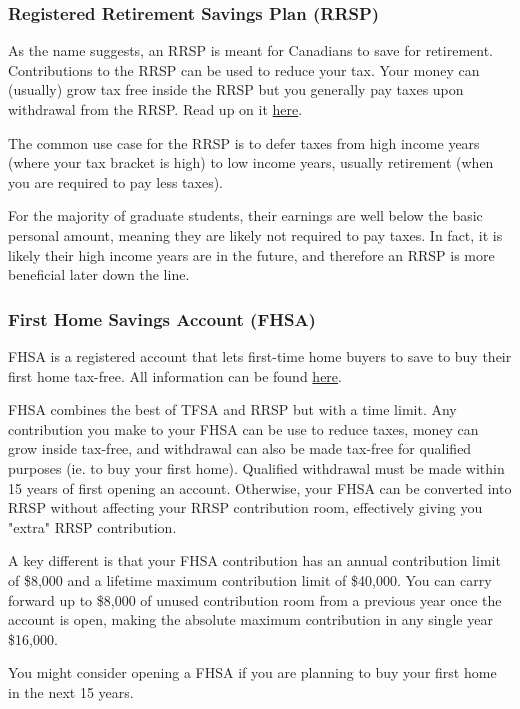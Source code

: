 \subsubsection{Registered Retirement Savings Plan (RRSP)} 
As the name suggests, an RRSP is meant for Canadians to save for retirement. Contributions to the RRSP can be used to reduce your tax. Your money can (usually) grow tax free inside the RRSP but you generally pay taxes upon withdrawal from the RRSP. Read up on it \href{https://www.canada.ca/en/revenue-agency/services/tax/individuals/topics/rrsps-related-plans/registered-retirement-savings-plan-rrsp.html}{here}.

The common use case for the RRSP is to defer taxes from high income years (where your tax bracket is high) to low income years, usually retirement (when you are required to pay less taxes). 

For the majority of graduate students, their earnings are well below the basic personal amount, meaning they are likely not required to pay taxes. In fact, it is likely their high income years are in the future, and therefore an RRSP is more beneficial later down the line.

\subsubsection{First Home Savings Account (FHSA)} 
FHSA is a registered account that lets first-time home buyers to save to buy their first home tax-free. All information can be found \href{https://www.canada.ca/en/revenue-agency/services/tax/individuals/topics/first-home-savings-account.html}{here}. 

FHSA combines the best of TFSA and RRSP but with a time limit. Any contribution you make to your FHSA can be use to reduce taxes, money can grow inside tax-free, and withdrawal can also be made tax-free for qualified purposes (ie. to buy your first home). Qualified withdrawal must be made within 15 years of first opening an account. Otherwise, your FHSA can be converted into RRSP without affecting your RRSP contribution room, effectively giving you "extra" RRSP contribution.

A key different is that your FHSA contribution has an annual contribution limit of \$8,000 and a lifetime maximum contribution limit of \$40,000. You can carry forward up to \$8,000 of unused contribution room from a previous year once the account is open, making the absolute maximum contribution in any single year \$16,000.

You might consider opening a FHSA if you are planning to buy your first home in the next 15 years.        